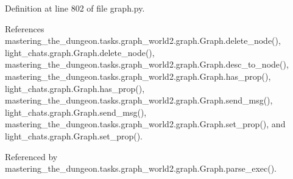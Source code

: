 Definition at line 802 of file graph.\+py.



References mastering\+\_\+the\+\_\+dungeon.\+tasks.\+graph\+\_\+world2.\+graph.\+Graph.\+delete\+\_\+node(), light\+\_\+chats.\+graph.\+Graph.\+delete\+\_\+node(), mastering\+\_\+the\+\_\+dungeon.\+tasks.\+graph\+\_\+world2.\+graph.\+Graph.\+desc\+\_\+to\+\_\+node(), mastering\+\_\+the\+\_\+dungeon.\+tasks.\+graph\+\_\+world2.\+graph.\+Graph.\+has\+\_\+prop(), light\+\_\+chats.\+graph.\+Graph.\+has\+\_\+prop(), mastering\+\_\+the\+\_\+dungeon.\+tasks.\+graph\+\_\+world2.\+graph.\+Graph.\+send\+\_\+msg(), light\+\_\+chats.\+graph.\+Graph.\+send\+\_\+msg(), mastering\+\_\+the\+\_\+dungeon.\+tasks.\+graph\+\_\+world2.\+graph.\+Graph.\+set\+\_\+prop(), and light\+\_\+chats.\+graph.\+Graph.\+set\+\_\+prop().



Referenced by mastering\+\_\+the\+\_\+dungeon.\+tasks.\+graph\+\_\+world2.\+graph.\+Graph.\+parse\+\_\+exec().

